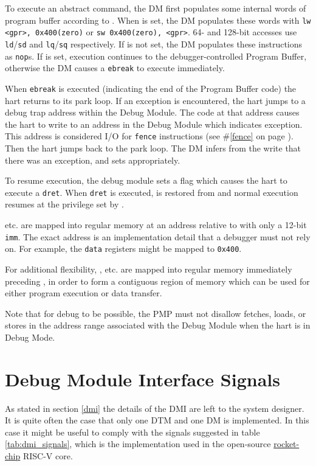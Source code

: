 To execute an abstract command, the DM first populates some internal words of
program buffer according to \RdmCommand. When \FacAccessregisterTransfer is set, the DM
populates these words with {\tt lw <gpr>, 0x400(zero)} or {\tt sw 0x400(zero), <gpr>}.
64- and 128-bit accesses use {\tt ld}/{\tt sd} and {\tt lq}/{\tt sq}
respectively. If \FacAccessregisterTransfer is not set, the DM populates these instructions as {\tt nop}s.
If \FcsrMcontrolExecute is set, execution continues to the debugger-controlled Program Buffer,
otherwise the DM causes a {\tt ebreak} to execute immediately.

When {\tt ebreak} is executed (indicating the end of the
Program Buffer code) the hart returns to its park loop. If an exception is
encountered, the hart jumps to a debug trap address within
the Debug Module. The code at that address causes the hart to
write to an address in the Debug Module which indicates exception.
This address is considered I/O for {\tt fence} instructions (see \#\ref{fence}
on page \pageref{fence}).
Then the hart jumps back to the park loop.
The DM infers from the write that there was an exception, and sets \FdmAbstractcsCmderr appropriately.

To resume execution, the debug module sets a flag which causes the hart to execute a {\tt dret}.
When {\tt dret} is executed, \Rpc is restored from \RcsrDpc and normal execution resumes at the
privilege set by \FcsrDcsrPrv.

\RdmDataZero etc. are mapped into regular memory at an address relative to \Rzero
with only a 12-bit {\tt imm}. The exact address is an implementation
detail that a debugger must not rely on. For example, the {\tt data}
registers might be mapped to {\tt 0x400}.

For additional flexibility, \RdmProgbufZero, etc. are mapped into regular memory
immediately preceding \RdmDataZero, in order to form a contiguous region of memory which
can be used for either program execution or data transfer.

Note that for debug to be possible, the PMP must not disallow fetches, loads, or stores
in the address range associated with the Debug Module when the hart is in Debug Mode.

\section{Debug Module Interface Signals} \label{dmi_signals}

As stated in section \ref{dmi} the details of the DMI are left to the system designer.
It is quite often the case that only one DTM and one DM is implemented.
In this case it might be useful to comply with the signals suggested in table \ref{tab:dmi_signals},
which is the implementation used in the open-source \href{https://github.com/chipsalliance/rocket-chip/blob/375045a7db1bdc7b4f7851f1a59b3f10a2b922ff/src/main/scala/devices/debug/Debug.scala#L170}{rocket-chip} RISC-V core.

